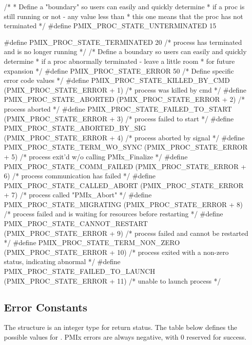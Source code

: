 \begin{codepar}
/*
* Define a "boundary" so users can easily and quickly determine
* if a proc is still running or not - any value less than
* this one means that the proc has not terminated
*/
#define PMIX_PROC_STATE_UNTERMINATED            15

#define PMIX_PROC_STATE_TERMINATED              20  /* process has terminated and is no longer running */
/* Define a boundary so users can easily and quickly determine
* if a proc abnormally terminated - leave a little room
* for future expansion
*/
#define PMIX_PROC_STATE_ERROR                   50
/* Define specific error code values */
#define PMIX_PROC_STATE_KILLED_BY_CMD           (PMIX_PROC_STATE_ERROR +  1)  /* process was killed by cmd */
#define PMIX_PROC_STATE_ABORTED                 (PMIX_PROC_STATE_ERROR +  2)  /* process aborted */
#define PMIX_PROC_STATE_FAILED_TO_START         (PMIX_PROC_STATE_ERROR +  3)  /* process failed to start */
#define PMIX_PROC_STATE_ABORTED_BY_SIG          (PMIX_PROC_STATE_ERROR +  4)  /* process aborted by signal */
#define PMIX_PROC_STATE_TERM_WO_SYNC            (PMIX_PROC_STATE_ERROR +  5)  /* process exit'd w/o calling PMIx_Finalize */
#define PMIX_PROC_STATE_COMM_FAILED             (PMIX_PROC_STATE_ERROR +  6)  /* process communication has failed */
#define PMIX_PROC_STATE_CALLED_ABORT            (PMIX_PROC_STATE_ERROR +  7)  /* process called "PMIx_Abort" */
#define PMIX_PROC_STATE_MIGRATING               (PMIX_PROC_STATE_ERROR +  8)  /* process failed and is waiting for resources before restarting */
#define PMIX_PROC_STATE_CANNOT_RESTART          (PMIX_PROC_STATE_ERROR +  9)  /* process failed and cannot be restarted */
#define PMIX_PROC_STATE_TERM_NON_ZERO           (PMIX_PROC_STATE_ERROR + 10)  /* process exited with a non-zero status, indicating abnormal */
#define PMIX_PROC_STATE_FAILED_TO_LAUNCH        (PMIX_PROC_STATE_ERROR + 11)  /* unable to launch process */
\end{codepar}
\cspecificend


\subsection{Error Constants}
\label{api:struct:errors}

The  structure is an integer type for return status.
The table below defines the possible values for .
PMIx errors are always negative, with 0 reserved for success.

